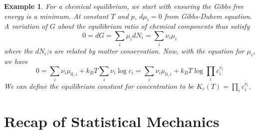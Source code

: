 \documentclass[a4paper]{article}
\newtheorem{eg}{Example}[section]
\theoremstyle{new}
\begin{document}
\begin{eg}
For a chemical equilibrium, we start with ensuring the Gibbs free energy is a minimum. At constant $T$ and $p$, $d\mu_i=0$ from Gibbs-Duhem equation. A variation of $G$ about the equilibrium ratio of chemical components thus satisfy
$$0=dG=\sum_i\mu_idN_i=\sum_i\nu_i\mu_i$$
where the $dN_i$;s are related by matter conservation. Now, with the equation for $\mu_i$, we have
$$0=\sum_i\nu_i\mu_{0,i}+k_BT\sum_i\nu_i\log c_i=\sum_i\nu_i\mu_{0,i}+k_BT\log\prod_i c_i^{\nu_i}$$
We can define the equilibrium constant for concentration to be $K_c(T)=\prod_i c_i^{\nu_i}$.
\end{eg}
\newpage
\section{Recap of Statistical Mechanics}
\end{document}
